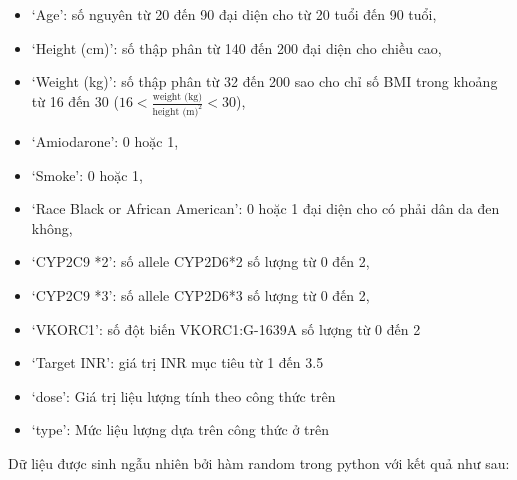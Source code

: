\documentclass[14pt,oneside]{scrbook}
\providecommand{\tightlist}{\setlength{\itemsep}{\smallskipamount}\setlength{\parskip}{\smallskipamount}}
\begin{document}
\begin{itemize}
\tightlist
\item
  `Age': số nguyên từ 20 đến 90 đại diện cho từ 20 tuổi đến 90 tuổi,
\item
  `Height (cm)': số thập phân từ 140 đến 200 đại diện cho chiều cao,
\item
  `Weight (kg)': số thập phân từ 32 đến 200 sao cho chỉ số BMI trong
  khoảng từ 16 đến 30 (\(16 < \frac{\text{weight (kg)}}{\text{height (m)}^2} < 30\)),
\item
  `Amiodarone': 0 hoặc 1,
\item
  `Smoke': 0 hoặc 1,
\item
  `Race Black or African American': 0 hoặc 1 đại diện cho có phải dân da
  đen không,
\item
  `CYP2C9 *2': số allele CYP2D6*2 số lượng từ 0 đến 2,
\item
  `CYP2C9 *3': số allele CYP2D6*3 số lượng từ 0 đến 2,
\item
  `VKORC1': số đột biến VKORC1:G-1639A số lượng từ 0 đến 2
\item
  `Target INR': giá trị INR mục tiêu từ 1 đến 3.5
\item
  `dose': Giá trị liệu lượng tính theo công thức trên
\item
  `type': Mức liệu lượng dựa trên công thức ở trên
\end{itemize}

Dữ liệu được sinh ngẫu nhiên bởi hàm random trong python với kết quả như
sau:
\end{document}
